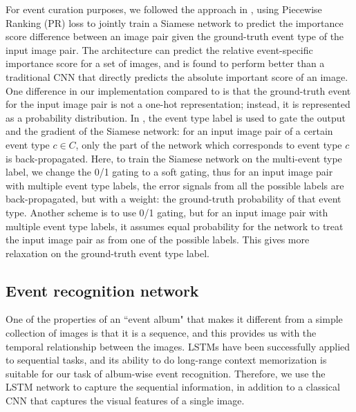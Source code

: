 \documentclass[runningheads]{llncs}
\begin{document}
For event curation purposes, we followed the approach in \cite{CVPR}, using Piecewise Ranking (PR) loss to jointly train a Siamese network to predict the importance score difference between an image pair given the ground-truth event type of the input image pair. The architecture can predict the relative event-specific importance score for a set of images, and is found to perform better than a traditional CNN that directly predicts the absolute important score of an image.
One difference in our implementation compared to \cite{CVPR} is that the ground-truth event for the input image pair  is not a one-hot representation; instead, it is represented as a probability distribution. In \cite{CVPR}, the event type label is used to gate the output and the gradient of the Siamese network: for an input image pair of a certain event type $c \in C$, only the part of the network which corresponds to event type $c$ is back-propagated.  Here, to train the Siamese network on the multi-event type label, we change the 0/1 gating to a soft gating, thus for an input image pair with multiple event type labels, the error signals from all the possible labels are back-propagated, but with a weight: the ground-truth probability of that event type. Another scheme is to use 0/1 gating, but for an input image pair with multiple event type labels, it assumes equal probability for the network to treat the input image pair as from one of the possible labels. This gives more relaxation on the ground-truth event type label.
%
%
%
%
%
\subsection{Event recognition network}
One of the properties of  an ``event album" that makes it different from a simple collection of images is that it is a sequence, and this provides us with the temporal relationship between the images. LSTMs have been successfully applied to sequential tasks, and its ability to do long-range context memorization is suitable for our task of album-wise event recognition. Therefore, we use the LSTM network to capture the sequential information, in addition to a classical CNN that captures the visual features of a single image. 
\end{document}
